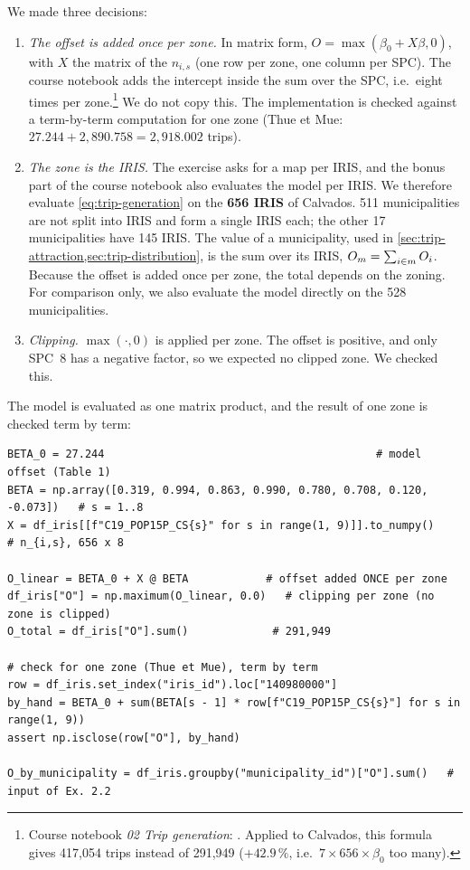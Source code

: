 We made three decisions:
\begin{enumerate}
  \item \emph{The offset is added once per zone.} In matrix form, $O = \max(\beta_0 + X\beta, 0)$, with $X$ the matrix of
  the $n_{i,s}$ (one row per zone, one column per SPC). The course notebook adds the intercept inside the sum over the
  SPC, i.e.\ eight times per zone.\footnote{Course notebook \emph{02 Trip generation}:
  . Applied to Calvados, this formula gives 417{,}054 trips instead
  of 291{,}949 ($+42.9\,\%$, i.e.\ $7 \times 656 \times \beta_0$ too many).} We do not copy this. The implementation is
  checked against a term-by-term computation for one zone (Thue et Mue: $27.244 + 2{,}890.758 = 2{,}918.002$ trips).
  \item \emph{The zone is the IRIS.} The exercise asks for a map per IRIS, and the bonus part of the course notebook
  also evaluates the model per IRIS. We therefore evaluate \cref{eq:trip-generation} on the \textbf{656 IRIS} of
  Calvados. 511 municipalities are not split into IRIS and form a single IRIS each; the other 17 municipalities have
  145 IRIS. The value of a municipality, used in \cref{sec:trip-attraction,sec:trip-distribution}, is the sum over its
  IRIS, $O_m = \sum_{i \in m} O_i$. Because the offset is added once per zone, the total depends on the zoning. For
  comparison only, we also evaluate the model directly on the 528 municipalities.
  \item \emph{Clipping.} $\max(\cdot, 0)$ is applied per zone. The offset is positive, and only SPC~8 has a negative
  factor, so we expected no clipped zone. We checked this.
\end{enumerate}
The model is evaluated as one matrix product, and the result of one zone is checked term by term:
\begin{lstlisting}[style=py]
BETA_0 = 27.244                                          # model offset (Table 1)
BETA = np.array([0.319, 0.994, 0.863, 0.990, 0.780, 0.708, 0.120, -0.073])   # s = 1..8
X = df_iris[[f"C19_POP15P_CS{s}" for s in range(1, 9)]].to_numpy()    # n_{i,s}, 656 x 8

O_linear = BETA_0 + X @ BETA            # offset added ONCE per zone
df_iris["O"] = np.maximum(O_linear, 0.0)   # clipping per zone (no zone is clipped)
O_total = df_iris["O"].sum()             # 291,949

# check for one zone (Thue et Mue), term by term
row = df_iris.set_index("iris_id").loc["140980000"]
by_hand = BETA_0 + sum(BETA[s - 1] * row[f"C19_POP15P_CS{s}"] for s in range(1, 9))
assert np.isclose(row["O"], by_hand)

O_by_municipality = df_iris.groupby("municipality_id")["O"].sum()   # input of Ex. 2.2
\end{lstlisting}

